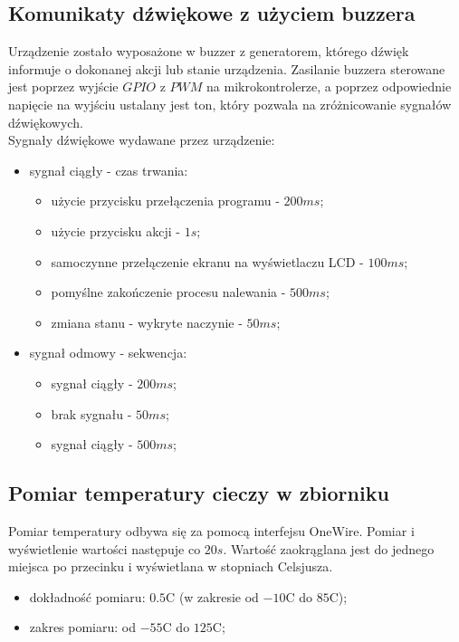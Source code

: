 \documentclass[11pt]{article}
\begin{document}
\subsection{Komunikaty dźwiękowe z użyciem buzzera}
Urządzenie zostało wyposażone w buzzer z generatorem, którego dźwięk informuje o dokonanej akcji lub stanie urządzenia. Zasilanie buzzera sterowane jest poprzez wyjście $GPIO$ z $PWM$ na mikrokontrolerze,
a poprzez odpowiednie napięcie na wyjściu ustalany jest ton, który pozwala na zróżnicowanie sygnałów dźwiękowych.\\

Sygnały dźwiękowe wydawane przez urządzenie:\\
\begin{itemize}
  \item sygnał ciągły - czas trwania:
  \begin{itemize}
      \item użycie przycisku przełączenia programu - $200ms$;
      \item użycie przycisku akcji - $1s$;
      \item samoczynne przełączenie ekranu na wyświetlaczu LCD - $100ms$;
      \item pomyślne zakończenie procesu nalewania - $500ms$;
      \item zmiana stanu - wykryte naczynie - $50ms$;
    \end{itemize}
  \item sygnał odmowy - sekwencja:
  \begin{itemize}
      \item sygnał ciągły - $200ms$;
      \item brak sygnału - $50ms$;
      \item sygnał ciągły - $500ms$;
    \end{itemize}
\end{itemize}

\subsection{Pomiar temperatury cieczy w zbiorniku}
Pomiar temperatury odbywa się za pomocą interfejsu OneWire. Pomiar i wyświetlenie wartości następuje co $20s$.
Wartość zaokrąglana jest do jednego miejsca po przecinku i wyświetlana w stopniach Celsjusza. 

\begin{itemize}
    \item dokładność pomiaru: $0.5$\textdegree{}C (w zakresie od $-10$\textdegree{}C do $85$\textdegree{}C);
    \item zakres pomiaru: od $-55$\textdegree{}C do $125$\textdegree{}C;
\end{itemize}
\end{document}
